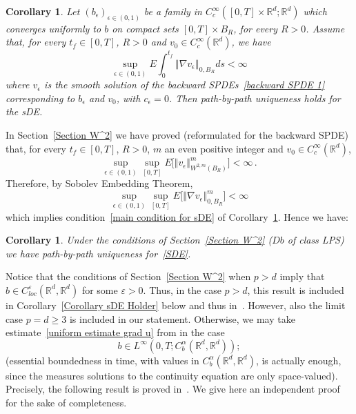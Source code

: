 \documentclass[a4paper,10pt]{article}
\newtheorem{corollary}[theorem]{Corollary}
\begin{document}
\begin{corollary}
\label{Coroll sufficient for sDE}Let $(  b_{\epsilon})
_{\epsilon\in(  0,1)  }$ be a family in $C_{c}^{\infty}(
[0,T]  \times\mathbb{R}^{d};\mathbb{R}^{d})$ which
converges uniformly to $b$ on compact sets $[0,T]  \times B_{R}$,
for every $R>0$. Assume that, for every $t_{f}\in [0,T]  $, $R>0$
and $v_{0}\in C_{c}^{\infty}(\mathbb{R}^{d})$, we have
\[
\sup_{\epsilon\in(  0,1)  }E\int_{0}^{t_{f}}\left\Vert \nabla
v_{\epsilon}\right\Vert _{0,B_R}ds<\infty
\]
where $v_{\epsilon}$ is the smooth solution of the backward SPDEs~\eqref{backward SPDE 1} corresponding to $b_{\epsilon}$ and $v_{0}$, with
$c_{\epsilon}=0$. Then path-by-path uniqueness holds for the sDE.
\end{corollary}

In Section~\ref{Section W^2} we have proved (reformulated for the backward SPDE) that, for every $t_{f}\in [0,T]  $, $R>0$, $m$ an
even positive integer and $v_{0}\in C_{c}^{\infty}(\mathbb{R}^{d})$,
\[
\sup_{\epsilon\in (0,1)  }\sup_{[0,T]  }E \Big[
\left\Vert v_{\epsilon}\right\Vert _{W^{2,m}( B_{R})  } 
^{m}\Big]  <\infty \,.
\]
Therefore, by Sobolev Embedding Theorem,
\begin{equation}
\sup_{\epsilon\in (0,1)}\sup_{[0,T]  }E \Big[
\left\Vert \nabla v_{\epsilon}\right\Vert _{0,B_R
}^{m}\Big]  <\infty\label{uniform estimate grad u} 
\end{equation}
which implies condition~\eqref{main condition for sDE} of Corollary~\ref{Coroll sufficient for sDE}. Hence we have:

\begin{corollary}
Under the conditions of Section~\ref{Section W^2} ($Db$ of class LPS) we
have path-by-path uniqueness for~\eqref{SDE}.
\end{corollary}

Notice that the conditions of Section~\ref{Section W^2} when $p>d$ imply that
$b\in C_{loc}^{\varepsilon}(\mathbb{R}^{d},\mathbb{R}^{d})$ for some $\varepsilon>0$. 
Thus, in the case $p>d$, this result is included in Corollary~\ref{Corollary sDE Holder} below
and thus in~\cite{DAVIE07}. However, also the limit case
$p=d\geq3$ is included in our statement. Otherwise, we may take estimate~\eqref{uniform estimate grad u} from
\cite{FLAGUBPRI10} in the case
\begin{equation}
b\in L^{\infty}(0,T;C_{b}^{\alpha}(\mathbb{R}^{d},\mathbb{R}^{d}));  \label{assumption C^alpha} 
\end{equation}
(essential boundedness in time, with values in $C_{b}^{\alpha}(\mathbb{R}^{d},\mathbb{R}^{d})$, is actually enough, since the measures solutions to the continuity equation are only space-valued). Precisely, the following result is proved in~\cite{FLAGUBPRI10}. We give here an
independent proof for the sake of completeness.
\end{document}

